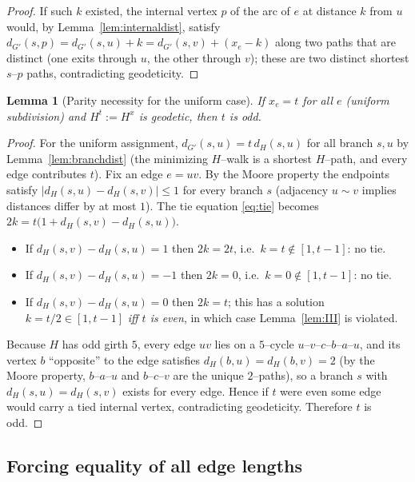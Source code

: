 \documentclass{amsart}
\theoremstyle{plain}
\newtheorem{lemma}{Lemma}
\theoremstyle{definition}
\newcommand{\dG}{d_{G'}}
\newcommand{\dH}{d_{H}}
\begin{document}
\begin{proof}
If such $k$ existed, the internal vertex $p$ of the arc of $e$ at distance $k$ from
$u$ would, by Lemma~\ref{lem:internaldist}, satisfy
$\dG(s,p)=\dG(s,u)+k=\dG(s,v)+(x_e-k)$ along two paths that are distinct (one exits
through $u$, the other through $v$); these are two distinct shortest $s$--$p$ paths,
contradicting geodeticity.
\end{proof}

\begin{lemma}[Parity necessity for the uniform case]\label{lem:parity}
If $x_e=t$ for all $e$ (uniform subdivision) and $H^t:=H^x$ is geodetic, then $t$ is
odd.
\end{lemma}

\begin{proof}
For the uniform assignment, $\dG(s,u)=t\,\dH(s,u)$ for all branch $s,u$ by
Lemma~\ref{lem:branchdist} (the minimizing $H$--walk is a shortest $H$--path, and
every edge contributes $t$). Fix an edge $e=uv$. By the Moore property the
endpoints satisfy $|\dH(s,u)-\dH(s,v)|\le1$ for every branch $s$ (adjacency $u\sim
v$ implies distances differ by at most $1$). The tie equation \eqref{eq:tie} becomes
$2k=t\bigl(1+\dH(s,v)-\dH(s,u)\bigr)$.
\begin{itemize}
\item If $\dH(s,v)-\dH(s,u)=1$ then $2k=2t$, i.e.\ $k=t\notin[1,t-1]$: no tie.
\item If $\dH(s,v)-\dH(s,u)=-1$ then $2k=0$, i.e.\ $k=0\notin[1,t-1]$: no tie.
\item If $\dH(s,v)-\dH(s,u)=0$ then $2k=t$; this has a solution $k=t/2\in[1,t-1]$
\emph{iff $t$ is even}, in which case Lemma~\ref{lem:III} is violated.
\end{itemize}
Because $H$ has odd girth $5$, every edge $uv$ lies on a $5$--cycle
$u$--$v$--$c$--$b$--$a$--$u$, and its vertex $b$ ``opposite'' to the edge satisfies
$\dH(b,u)=\dH(b,v)=2$ (by the Moore property, $b$--$a$--$u$ and $b$--$c$--$v$ are the
unique $2$--paths), so a branch $s$ with $\dH(s,u)=\dH(s,v)$ exists for every edge.
Hence if $t$ were even some edge would carry a tied internal vertex, contradicting
geodeticity. Therefore $t$ is odd.
\end{proof}

\subsection{Forcing equality of all edge lengths}\label{ssec:equal}
\end{document}

